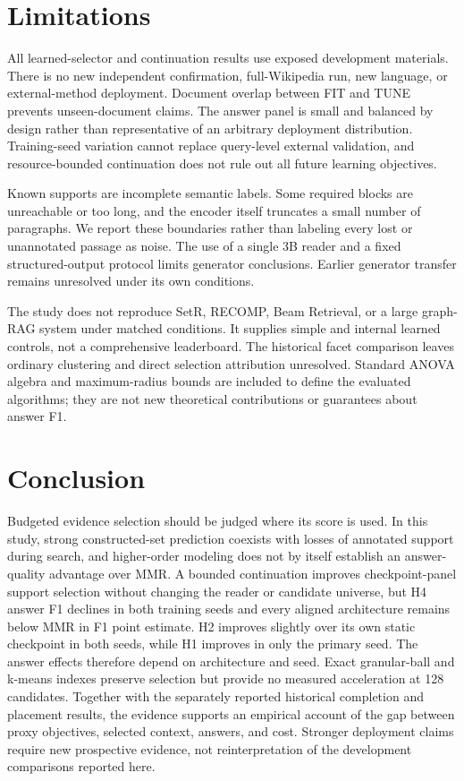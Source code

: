 \documentclass[pdflatex,sn-mathphys-num]{sn-jnl}
\begin{document}
\section{Limitations}
All learned-selector and continuation results use exposed development
materials. There is no new independent confirmation, full-Wikipedia run,
new language, or external-method deployment. Document overlap between FIT
and TUNE prevents unseen-document claims. The answer panel is small and
balanced by design rather than representative of an arbitrary deployment
distribution. Training-seed variation cannot replace query-level external
validation, and resource-bounded continuation does not rule out all future
learning objectives.

Known supports are incomplete semantic labels. Some required blocks are
unreachable or too long, and the encoder itself truncates a small number of
paragraphs. We report these boundaries rather than labeling every lost or
unannotated passage as noise. The use of a single 3B reader and a fixed
structured-output protocol limits generator conclusions. Earlier generator
transfer remains unresolved under its own conditions.

The study does not reproduce SetR, RECOMP, Beam Retrieval, or a large
graph-RAG system under matched conditions. It supplies simple and internal
learned controls, not a comprehensive leaderboard. The historical facet
comparison leaves ordinary clustering and direct selection attribution
unresolved. Standard ANOVA algebra and maximum-radius bounds are included
to define the evaluated algorithms; they are not new theoretical
contributions or guarantees about answer F1.

\section{Conclusion}
Budgeted evidence selection should be judged where its score is used.
In this study, strong constructed-set prediction coexists with losses of
annotated support during search, and higher-order modeling does not by
itself establish an answer-quality advantage over MMR. A bounded continuation
improves checkpoint-panel support selection without changing the reader or
candidate universe, but H4 answer F1 declines in both training seeds and
every aligned architecture remains below MMR in F1 point estimate.
H2 improves slightly over its own static checkpoint in both seeds, while
H1 improves in only the primary seed. The answer effects therefore depend
on architecture and seed. Exact granular-ball and k-means indexes
preserve selection but provide no measured acceleration at 128 candidates.
Together with the separately reported historical completion and placement
results, the evidence supports an empirical account of the gap between
proxy objectives, selected context, answers, and cost. Stronger deployment
claims require new prospective evidence, not reinterpretation of the
development comparisons reported here.
\end{document}
